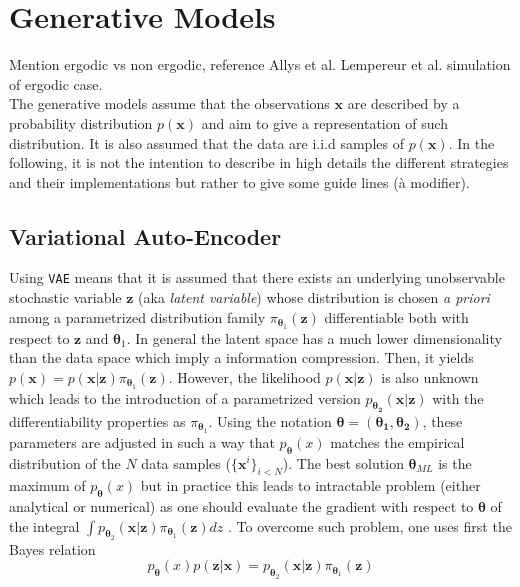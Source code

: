 \documentclass[11pt]{amsart}
\begin{document}
\section{Generative Models}
%
{\color{red} Mention ergodic vs non ergodic, reference Allys et al. Lempereur et al. simulation of ergodic case.}\hfill\\

The generative models assume that the observations $\bm{x}$ are described by a probability distribution $p(\bm{x})$ and aim to give a representation of such distribution.  It is also assumed that the data are i.i.d samples of $p(\bm{x})$.  In the following, it is not the intention to describe in high details the different  strategies and their implementations but rather {\color{red} to give some guide lines (à modifier)}.
%
\subsection{Variational Auto-Encoder}
%
Using \texttt{VAE} \citep{Kingma2014} means that it is assumed that there exists an underlying unobservable stochastic variable $\bm{z}$  (aka \textit{latent variable}) whose distribution is chosen \textit{a priori} among a parametrized distribution family $\pi_{\bm{\theta}_1}(\bm{z})$ differentiable both with respect to $\bm{z}$ and $\bm{\theta}_1$. In general the latent space has a much lower dimensionality than the data space which imply a information compression. Then, it yields $p(\bm{x}) = p(\bm{x}|\bm{z})\pi_{\bm{\theta}_1}(\bm{z})$. However, the likelihood  $p(\bm{x}|\bm{z})$ is also unknown which leads to the introduction of a parametrized version $p_{\bm{\theta_2}}(\bm{x}|\bm{z})$ with the differentiability properties as $\pi_{\bm{\theta}_1}$. Using the notation $\bm{\theta}=(\bm{\theta_1},\bm{\theta_2})$,  these parameters are adjusted in such a way that  $p_{\bm{\theta}}(x)$ matches the empirical distribution of the $N$ data samples ($\{\bm{x}^{i}\}_{i<N}$). The best solution $\bm{\theta}_{ML}$ is the maximum of $p_{\bm{\theta}}(x)$ but in practice this leads to  intractable problem (either analytical or numerical) as one should evaluate the gradient with respect to $\bm{\theta}$ of the integral 
$\int p_{\bm{\theta}_2}(\bm{x}|\bm{z})\pi_{\bm{\theta}_1}(\bm{z}) dz$ \citep{Kingma2014}. To overcome such problem, one uses first the Bayes relation
\begin{equation}
p_{\bm{\theta}}(x) p(\bm{z}|\bm{x}) = p_{\bm{\theta}_2}(\bm{x}|\bm{z})\pi_{\bm{\theta}_1}(\bm{z})
\end{equation}
\end{document}
